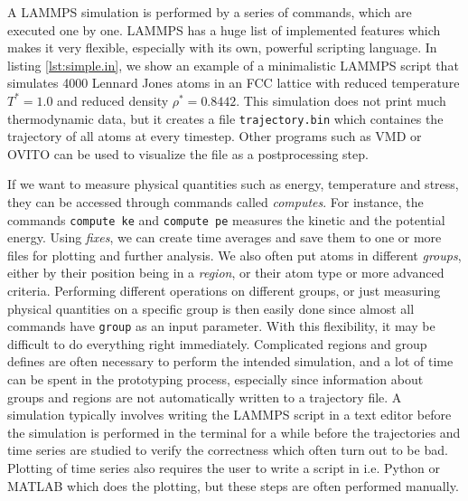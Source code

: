 \documentclass[aps,pre,twocolumn,letterpaper,floatfix,nofootinbib]{revtex4}
\newcommand{\code}[1]{\colorbox{light-gray}{\color{RawSienna}\texttt{#1}}}
\begin{document}
A LAMMPS simulation is performed by a series of commands, which are executed one by one.
LAMMPS has a huge list of implemented features which makes it very flexible, especially with its own, powerful scripting language.
In listing \ref{lst:simple.in}, we show an example of a minimalistic LAMMPS script that simulates 4000 Lennard Jones atoms in an FCC lattice with reduced temperature $T^*=1.0$ and reduced density $\rho^* = 0.8442$.
This simulation does not print much thermodynamic data, but it creates a file \code{trajectory.bin} which containes the trajectory of all atoms at every timestep.
Other programs such as VMD\citep{Humphrey1996Vmd} or OVITO\citep{Stukowski2009Visualization} can be used to visualize the file as a postprocessing step.

If we want to measure physical quantities such as energy, temperature and stress, they can be accessed through commands called \textit{computes}.
For instance, the commands \code{compute ke} and \code{compute pe} measures the kinetic and the potential energy.
Using \textit{fixes}, we can create time averages and save them to one or more files for plotting and further analysis.
We also often put atoms in different \textit{groups}, either by their position being in a \textit{region}, or their atom type or more advanced criteria.
Performing different operations on different groups, or just measuring physical quantities on a specific group is then easily done since almost all commands have \code{group} as an input parameter.
With this flexibility, it may be difficult to do everything right immediately.
Complicated regions and group defines are often necessary to perform the intended simulation, and a lot of time can be spent in the prototyping process, especially since information about groups and regions are not automatically written to a trajectory file.
A simulation typically involves writing the LAMMPS script in a text editor before the simulation is performed in the terminal for a while before the trajectories and time series are studied to verify the correctness which often turn out to be bad.
Plotting of time series also requires the user to write a script in i.e. Python or MATLAB which does the plotting, but these steps are often performed manually.
\end{document}
